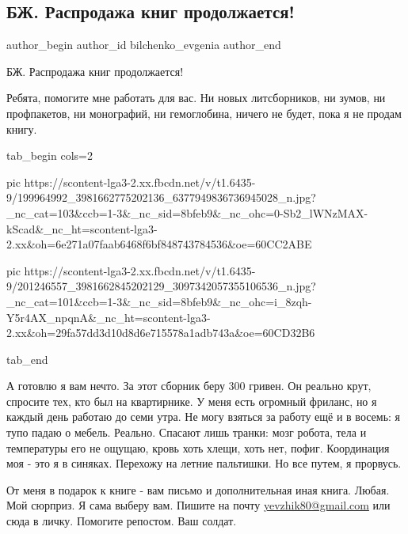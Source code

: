  
 
 
 
 
 
\subsection{БЖ. Распродажа книг продолжается!}
\label{sec:15_06_2021.fb.bilchenko_evgenia.2.rasprodazha_knig}
\ifcmt
 author_begin
   author_id bilchenko_evgenia
 author_end
\fi

БЖ. Распродажа книг продолжается! 

Ребята, помогите мне работать для вас. Ни новых литсборников, ни зумов, ни
профпакетов, ни монографий, ни гемоглобина, ничего не будет, пока я не продам
книгу. 

\ifcmt
  tab_begin cols=2

     pic https://scontent-lga3-2.xx.fbcdn.net/v/t1.6435-9/199964992_3981662775202136_6377949836736945028_n.jpg?_nc_cat=103&ccb=1-3&_nc_sid=8bfeb9&_nc_ohc=0-Sb2_lWNzMAX-kScad&_nc_ht=scontent-lga3-2.xx&oh=6e271a07faab6468f6bf848743784536&oe=60CC2ABE

     pic https://scontent-lga3-2.xx.fbcdn.net/v/t1.6435-9/201246557_3981662845202129_3097342057355106536_n.jpg?_nc_cat=101&ccb=1-3&_nc_sid=8bfeb9&_nc_ohc=i_8zqh-Y5r4AX_npqnA&_nc_ht=scontent-lga3-2.xx&oh=29fa57dd3d10d8d6e715578a1adb743a&oe=60CD32B6

  tab_end
\fi

А готовлю я вам нечто. За этот сборник беру 300 гривен. Он реально крут,
спросите тех, кто был на квартирнике.  У меня есть огромный фриланс, но я
каждый день работаю до семи утра. Не могу взяться за работу ещё и в восемь: я
тупо падаю о мебель. Реально. Спасают лишь транки: мозг робота, тела и
температуры его не ощущаю, кровь хоть хлещи, хоть нет, пофиг. Координация моя -
это я в синяках. Перехожу на летние пальтишки. Но все путем, я прорвусь. 

От меня в подарок к книге - вам письмо и дополнительная иная книга. Любая. Мой
сюрприз. Я сама выберу вам. Пишите на почту \url{yevzhik80@gmail.com} или сюда
в личку. Помогите репостом. Ваш солдат.

